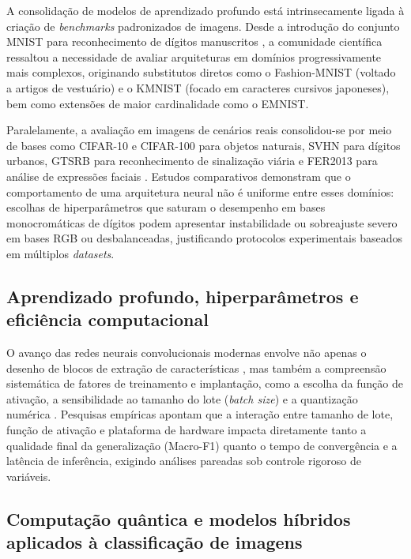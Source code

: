 \documentclass[
    12pt,
    openright,
    oneside,
    a4paper,
    english,
    brazil
]{abntex2}
\begin{document}
A consolidação de modelos de aprendizado profundo está intrinsecamente ligada à criação de \textit{benchmarks} padronizados de imagens. Desde a introdução do conjunto MNIST para reconhecimento de dígitos manuscritos \cite{LeCun2015}, a comunidade científica ressaltou a necessidade de avaliar arquiteturas em domínios progressivamente mais complexos, originando substitutos diretos como o Fashion-MNIST (voltado a artigos de vestuário) e o KMNIST (focado em caracteres cursivos japoneses), bem como extensões de maior cardinalidade como o EMNIST.

Paralelamente, a avaliação em imagens de cenários reais consolidou-se por meio de bases como CIFAR-10 e CIFAR-100 para objetos naturais, SVHN para dígitos urbanos, GTSRB para reconhecimento de sinalização viária e FER2013 para análise de expressões faciais \cite{szeliski2022computer}. Estudos comparativos demonstram que o comportamento de uma arquitetura neural não é uniforme entre esses domínios: escolhas de hiperparâmetros que saturam o desempenho em bases monocromáticas de dígitos podem apresentar instabilidade ou sobreajuste severo em bases RGB ou desbalanceadas, justificando protocolos experimentais baseados em múltiplos \textit{datasets}.

\subsection{Aprendizado profundo, hiperparâmetros e eficiência computacional}

O avanço das redes neurais convolucionais modernas envolve não apenas o desenho de blocos de extração de características \cite{szegedy2014going,he2016resnet,zhao2024improvedpooling}, mas também a compreensão sistemática de fatores de treinamento e implantação, como a escolha da função de ativação, a sensibilidade ao tamanho do lote (\textit{batch size}) e a quantização numérica \cite{goodfellow2016deep,zandieh2025turboquant}. Pesquisas empíricas apontam que a interação entre tamanho de lote, função de ativação e plataforma de hardware impacta diretamente tanto a qualidade final da generalização (Macro-F1) quanto o tempo de convergência e a latência de inferência, exigindo análises pareadas sob controle rigoroso de variáveis.

\subsection{Computação quântica e modelos híbridos aplicados à classificação de imagens}
\end{document}
